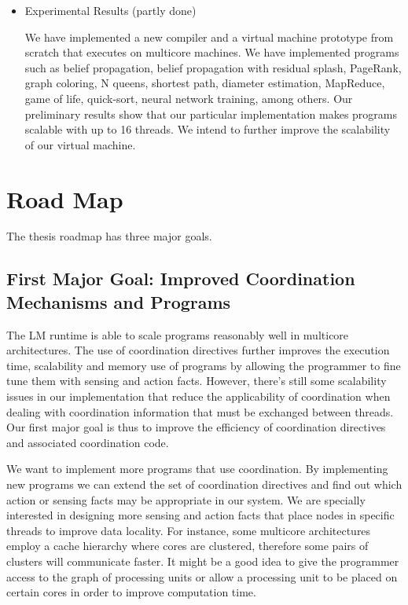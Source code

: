 \documentclass[10pt]{article}
\begin{document}
\begin{itemize}
   \item Experimental Results (partly done)

   We have implemented a new compiler and a virtual machine prototype from
   scratch that executes on multicore machines.  We have implemented programs
   such as belief propagation, belief propagation with residual splash,
   PageRank, graph coloring, N queens, shortest path, diameter estimation,
   MapReduce, game of life, quick-sort, neural network training, among others.
   Our preliminary results show that our particular implementation makes
   programs scalable with up to 16 threads. We intend to further improve the
   scalability of our virtual machine.
   
\end{itemize}

\section{Road Map}

The thesis roadmap has three major goals.

\subsection{First Major Goal: Improved Coordination Mechanisms and Programs}

The LM runtime is able to scale programs reasonably well in multicore
architectures. The use of coordination directives further improves the execution
time, scalability and memory use of programs by allowing the programmer to
fine tune them with sensing and action facts.
However, there's still some scalability issues in our implementation that reduce the applicability of
coordination when dealing with coordination information that must be
exchanged between threads. Our first major goal is thus to improve
the efficiency of coordination directives and associated coordination code.

We want to implement more programs that use coordination. By implementing new
programs we can extend the set of coordination directives and find out which
action or sensing facts may be appropriate in our system. We are specially
interested in designing more sensing and action facts that place nodes in
specific threads to improve data locality.  For instance, some multicore
architectures employ a cache hierarchy where cores are clustered, therefore some
pairs of clusters will communicate faster. It might be a good idea to give the
programmer access to the graph of processing units or allow a processing unit to
be placed on certain cores in order to improve computation time.
\end{document}
